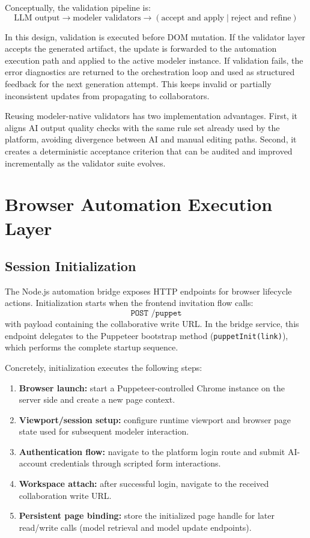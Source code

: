 Conceptually, the validation pipeline is:
\[
\text{LLM output} \rightarrow \text{modeler validators} \rightarrow (\text{accept and apply} \mid \text{reject and refine})
\]

In this design, validation is executed before DOM mutation. If the validator layer accepts the generated artifact, the update is forwarded to the automation execution path and applied to the active modeler instance. If validation fails, the error diagnostics are returned to the orchestration loop and used as structured feedback for the next generation attempt. This keeps invalid or partially inconsistent updates from propagating to collaborators.

Reusing modeler-native validators has two implementation advantages. First, it aligns AI output quality checks with the same rule set already used by the platform, avoiding divergence between AI and manual editing paths. Second, it creates a deterministic acceptance criterion that can be audited and improved incrementally as the validator suite evolves.

\section{Browser Automation Execution Layer}
\subsection{Session Initialization}
The Node.js automation bridge exposes HTTP endpoints for browser lifecycle actions. Initialization starts when the frontend invitation flow calls:
\[
\texttt{POST /puppet}
\]
with payload containing the collaborative write URL. In the bridge service, this endpoint delegates to the Puppeteer bootstrap method (\texttt{puppetInit(link)}), which performs the complete startup sequence.

Concretely, initialization executes the following steps:
\begin{enumerate}
    \item \textbf{Browser launch:} start a Puppeteer-controlled Chrome instance on the server side and create a new page context.
    \item \textbf{Viewport/session setup:} configure runtime viewport and browser page state used for subsequent modeler interaction.
    \item \textbf{Authentication flow:} navigate to the platform login route and submit AI-account credentials through scripted form interactions.
    \item \textbf{Workspace attach:} after successful login, navigate to the received collaboration write URL.
    \item \textbf{Persistent page binding:} store the initialized page handle for later read/write calls (model retrieval and model update endpoints).
\end{enumerate}

